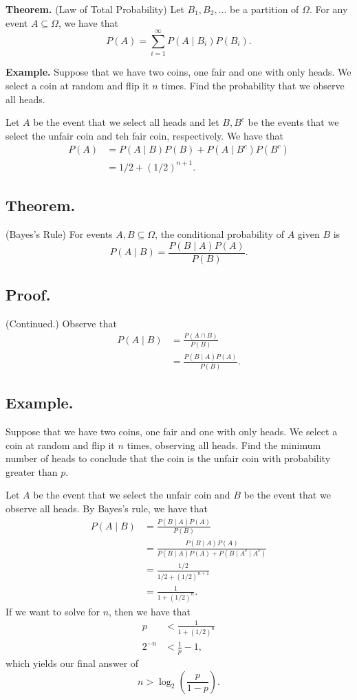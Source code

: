 \documentclass[titlepage]{article}
\begin{document}
\textbf{Theorem.} (Law of Total Probability) Let $B_{1}, B_{2}, \ldots$ be a partition of $\Omega$. For any event $A \subseteq \Omega$, we have that 
$$P(A) = \sum_{i=1}^{\infty}P(A \mid B_{i})P(B_{i}).$$

\textbf{Example.} Suppose that we have two coins, one fair and one with only heads. We select a coin at random and flip it $n$ times. Find the probability that we observe all heads.

Let $A$ be the event that we select all heads and let $B, B^{c}$ be the events that we select the unfair coin and teh fair coin, respectively. We have that 
\begin{align*}
    P(A) &= P(A \mid B)P(B) + P(A \mid B^{c})P(B^{c}) \\
         &= 1/2 + (1/2)^{n+1}.
\end{align*}

\subsection{Theorem.} (Bayes's Rule) For events $A, B \subseteq \Omega$, the conditional probability of $A$ given $B$ is 
$$P(A \mid B) = \frac{P(B \mid A)P(A)}{P(B)}.$$

\subsection{Proof.} (Continued.) Observe that 
\begin{align*}
    P(A \mid B) &= \frac{P(A \cap B)}{P(B)} \\
                &= \frac{P(B \mid A)P(A)}{P(B)}.
\end{align*}

\subsection{Example.} Suppose that we have two coins, one fair and one with only heads. We select a coin at random and flip it $n$ times, observing all heads. Find the minimum number of heads to conclude that the coin is the unfair coin with probability greater than $p$.

Let $A$ be the event that we select the unfair coin and $B$ be the event that we observe all heads. By Bayes's rule, we have that  
\begin{align*}
    P(A \mid B) &= \frac{P(B \mid A)P(A)}{P(B)} \\
                &= \frac{P(B \mid A)P(A)}{P(B \mid A)P(A) + P(B \mid A^{c} \mid A^{c})} \\
                &= \frac{1/2}{1/2 + (1/2)^{n+1}} \\
                &= \frac{1}{1 + (1/2)^{n}}.
\end{align*}
If we want to solve for $n$, then we have that 
\begin{align*}
    p &<\frac{1}{1 + (1/2)^{n}} \\
    2^{-n} &< \frac{1}{p} - 1,
\end{align*}
which yields our final answer of 
$$n > \log_{2}\left(\frac{p}{1-p}\right).$$
\end{document}
